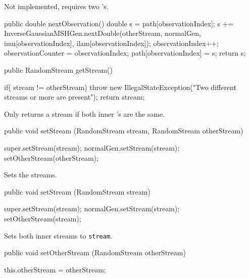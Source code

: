 \begin{tabb}
Not implemented, requires two 
's.
\end{tabb}
\begin{code}\begin{hide}

   public double nextObservation() {
        double s = path[observationIndex];
        s += InverseGaussianMSHGen.nextDouble(otherStream, normalGen,
                  imu[observationIndex], ilam[observationIndex]);
        observationIndex++;
        observationCounter = observationIndex;
        path[observationIndex] = s;
        return s;
    }\end{hide}

   public RandomStream getStream() \begin{hide} {
        if( stream != otherStream)
            throw new IllegalStateException("Two different streams or more are present");
        return stream;
    }\end{hide}
\end{code}
\begin{tabb} Only returns a stream if both inner 
's are the same.
\end{tabb}
\begin{code}

   public void setStream (RandomStream stream, RandomStream otherStream) \begin{hide} {
        super.setStream(stream);
        normalGen.setStream(stream);
        setOtherStream(otherStream);
    }\end{hide}
\end{code}
\begin{tabb} Sets the streams.
\end{tabb}
\begin{code}

   public void setStream (RandomStream stream) \begin{hide} {
        super.setStream(stream);
        normalGen.setStream(stream);
        setOtherStream(stream);
    }\end{hide}
\end{code}
\begin{tabb} Sets both inner streams to \texttt{stream}.  
\end{tabb}
\begin{code}

   public void setOtherStream (RandomStream otherStream) \begin{hide} {
        this.otherStream = otherStream;
    }\end{hide}
\end{code}
